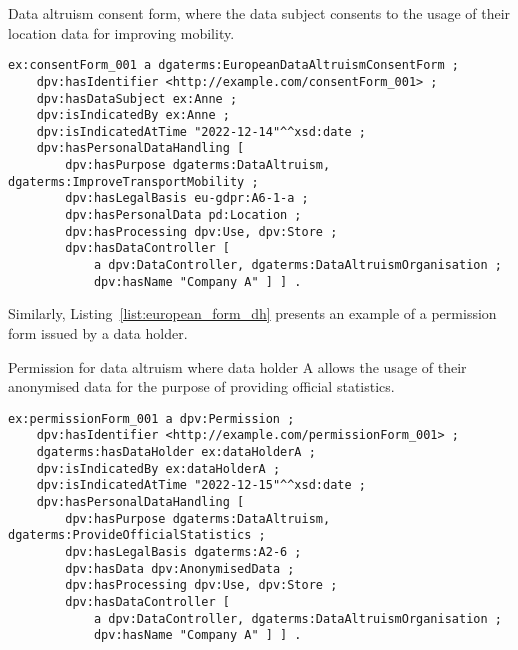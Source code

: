 \begin{listing}[ht]
\caption[Data altruism consent form.]{Data altruism consent form, where the data subject consents to the usage of their location data for improving mobility.}
\label{list:european_form_ds}
\begin{verbatim}
ex:consentForm_001 a dgaterms:EuropeanDataAltruismConsentForm ;
    dpv:hasIdentifier <http://example.com/consentForm_001> ;
    dpv:hasDataSubject ex:Anne ;
    dpv:isIndicatedBy ex:Anne ;
    dpv:isIndicatedAtTime "2022-12-14"^^xsd:date ;
    dpv:hasPersonalDataHandling [
        dpv:hasPurpose dgaterms:DataAltruism, dgaterms:ImproveTransportMobility ;
        dpv:hasLegalBasis eu-gdpr:A6-1-a ;
        dpv:hasPersonalData pd:Location ;
        dpv:hasProcessing dpv:Use, dpv:Store ;
        dpv:hasDataController [
            a dpv:DataController, dgaterms:DataAltruismOrganisation ;
            dpv:hasName "Company A" ] ] .
\end{verbatim}
\end{listing}

Similarly, Listing~\ref{list:european_form_dh} presents an example of a permission form issued by a data holder.

\begin{listing}[ht]
\caption[Data holder's permission for data altruism.]{Permission for data altruism where data holder A allows the usage of their anonymised data for the purpose of providing official statistics.}
\label{list:european_form_dh}
\begin{verbatim}
ex:permissionForm_001 a dpv:Permission ;
    dpv:hasIdentifier <http://example.com/permissionForm_001> ;
    dgaterms:hasDataHolder ex:dataHolderA ;
    dpv:isIndicatedBy ex:dataHolderA ;
    dpv:isIndicatedAtTime "2022-12-15"^^xsd:date ;
    dpv:hasPersonalDataHandling [
        dpv:hasPurpose dgaterms:DataAltruism, dgaterms:ProvideOfficialStatistics ;
        dpv:hasLegalBasis dgaterms:A2-6 ;
        dpv:hasData dpv:AnonymisedData ;
        dpv:hasProcessing dpv:Use, dpv:Store ;
        dpv:hasDataController [
            a dpv:DataController, dgaterms:DataAltruismOrganisation ;
            dpv:hasName "Company A" ] ] .
\end{verbatim}
\end{listing}